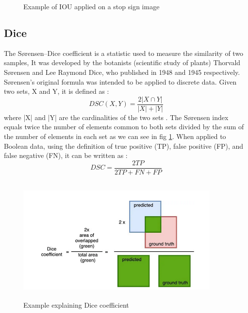 \begin{figure}[H]
\centering
  \vspace{-0.1in}
    \centerline{}
    \caption{Example of IOU applied on a stop sign image}
\end{figure}

\subsection{Dice}
\hspace{\parindent}
The Sørensen–Dice coefficient is a statistic used to measure the similarity of two samples, It was developed by the botanists (scientific study of plants) Thorvald Sørensen and Lee Raymond Dice, who published in 1948 and 1945 respectively.\\
Sørensen's original formula was intended to be applied to discrete data. Given two sets, X and Y, it is defined as :
\begin{equation}
    DSC(X, Y) = \frac{2 | X \cap Y |}{| X |  +  | Y |}
\end{equation}
where |X| and |Y| are the cardinalities of the two sets . The Sørensen index equals twice the number of elements common to both sets divided by the sum of the number of elements in each set as we can see in fig \ref{fig:DSC_EX}. 
When applied to Boolean data, using the definition of true positive (TP), false positive (FP), and false negative (FN), it can be written as :
\begin{equation}
    DSC = \frac{2 TP}{2 TP + FN + FP}
\end{equation}

\begin{figure}[H]
\centering
  \vspace{-0.1in}
    \centerline{\includegraphics[width = 4in, height = 2.5in]{../images/DSC.png}}
    \caption{Example explaining Dice coefficient}
    \label{fig:DSC_EX}
\end{figure}

